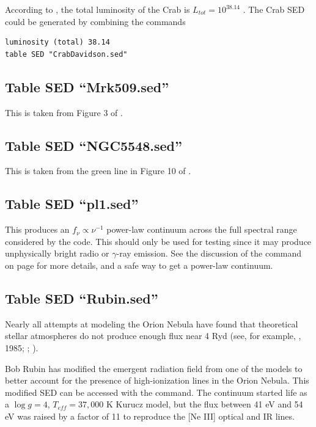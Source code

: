 According to \citet{Davidson1985}, the total luminosity of the Crab is
$L_{tot} = 10^{38.14}$ \ergps.
The Crab SED could be generated by combining
the commands
\begin{verbatim}
luminosity (total) 38.14
table SED "CrabDavidson.sed"
\end{verbatim}

\subsection{Table SED ``Mrk509.sed''}

This is taken from Figure 3 of \citet{2011A&A...534A..36K}.

\subsection{Table SED ``NGC5548.sed''}

This is taken from the green line in Figure 10 of \citet{2015A&A...575A..22M}.

\subsection{Table SED ``pl1.sed''}

This produces an $f_{\nu} \propto \nu^{-1}$ power-law continuum across the
full spectral range considered by the code.
This should only be used for testing since it may produce unphysically bright 
radio or $\gamma$-ray emission.
See the discussion of the  command on page \pageref{sec:CommandPowerLaw}
for more details, and a safe way to get a power-law continuum.

\subsection{Table SED ``Rubin.sed''}

Nearly all attempts at modeling the Orion Nebula have found that
theoretical stellar atmospheres do not produce enough flux
near 4 Ryd (see,
for example, \citealp{Mathis1982}, 1985; \citealp{Rubin1991};
\citealp{Sellmaier1996}).

Bob Rubin has modified the emergent radiation field from one of the
\citet{Kurucz1979} models to better account for the presence of
high-ionization lines in the Orion Nebula.
This modified SED can be accessed with the
 command.
The continuum started life as a
$\log g = 4$, $T_{eff} = 37{,}000$
K Kurucz model, but the flux between 41 eV and 54 eV was raised
by a factor of 11 to reproduce the [Ne III] optical and IR lines.

